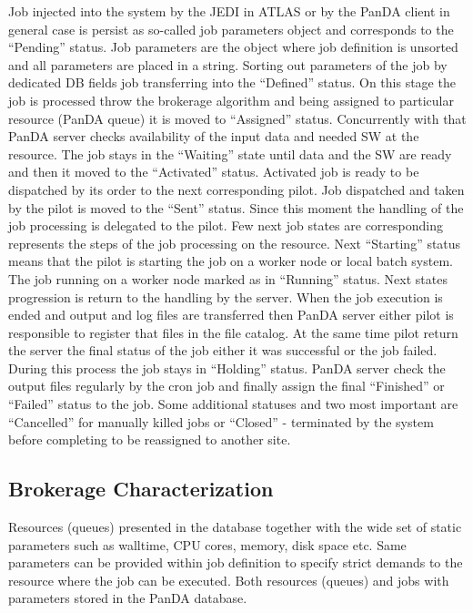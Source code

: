 Job injected into the system by the JEDI in ATLAS or by the PanDA client in
general case is persist as so-called job parameters object and corresponds to
the ``Pending'' status. Job parameters are the object where job definition is
unsorted and all parameters are placed in a string. Sorting out parameters of
the job by dedicated DB fields job transferring into the ``Defined'' status. On
this stage the job is processed throw the brokerage algorithm and being
assigned to particular resource (PanDA queue) it is moved to ``Assigned''
status. Concurrently with that PanDA server checks availability of the input
data and needed SW at the resource. The job stays in the ``Waiting'' state
until data and the SW are ready and then it moved to the ``Activated'' status.
Activated job is ready to be dispatched by its order to the next corresponding
pilot. Job dispatched and taken by the pilot is moved to the ``Sent'' status.
Since this moment the handling of the job processing is delegated to the pilot.
Few next job states are corresponding represents the steps of the job
processing on the resource. Next ``Starting'' status means that the pilot is
starting the job on a worker node or local batch system. The job running on a
worker node marked as in ``Running'' status. Next states progression is return
to the handling by the server. When the job execution is ended and output and
log files are transferred then PanDA server either pilot is responsible to
register that files in the file catalog. At the same time pilot return the
server the final status of the job either it was successful or the job failed.
During this process the job stays in ``Holding'' status. PanDA server check the
output files regularly by the cron job and finally assign the final
``Finished'' or ``Failed'' status to the job. Some additional statuses and two
most important are ``Cancelled'' for manually killed jobs or ``Closed'' -
terminated by the system before completing to be reassigned to another site.

\subsection{Brokerage Characterization}
\label{subsec:brokerage}

Resources (queues) presented in the database together with the wide set of
static parameters such as walltime, CPU cores, memory, disk space etc. Same
parameters can be provided within job definition to specify strict demands to
the resource where the job can be executed. Both resources (queues) and jobs
with parameters stored in the PanDA database.

